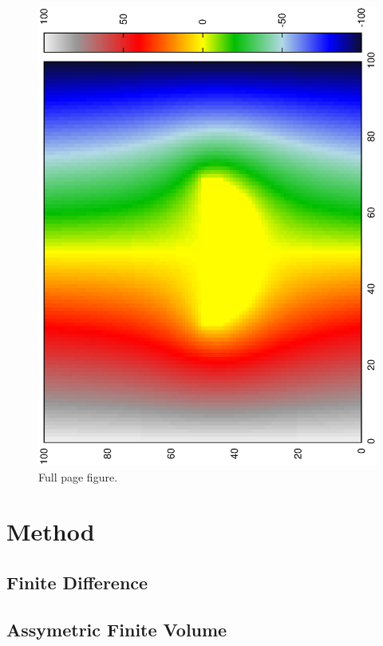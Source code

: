 \documentclass[aps,twocolumn,pre,nofootinbib]{revtex4}
\begin{document}
\begin{figure}

\includegraphics*[width= 1.6 \columnwidth]{circle.ps} 
\caption{Full page figure.
}
\label{fig:Full}
\end{figure}


\section{Method \label{sec:met}}

 
\subsection{Finite Difference }


\subsection{Assymetric Finite Volume }
\end{document}

